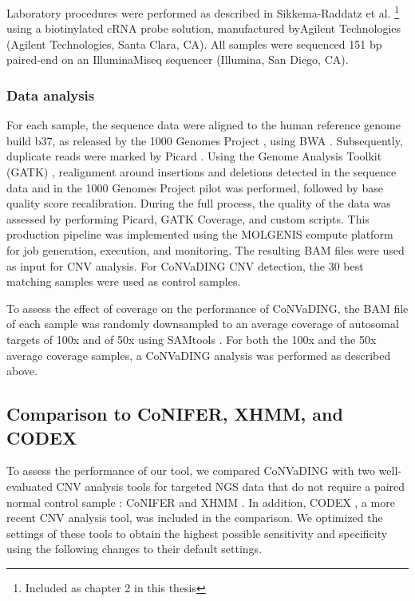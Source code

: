 Laboratory procedures were performed as described in Sikkema-Raddatz et al. \cite{Sikkema_Raddatz_2013}\footnote{Included as chapter 2 in this thesis} using a biotinylated cRNA probe solution, manufactured byAgilent Technologies (Agilent Technologies, Santa Clara, CA). 
All samples were sequenced 151 bp paired-end on an IlluminaMiseq sequencer (Illumina, San Diego, CA).

\subsubsection{Data analysis}
For each sample, the sequence data were aligned to the human reference genome build b37, as released by the 1000 Genomes Project \cite{Durbin_2010}, using BWA \cite{Li_2010}. 
Subsequently, duplicate reads were marked by Picard \cite{Picard_nd}. 
Using the Genome Analysis Toolkit (GATK) \cite{McKenna_2010}, realignment around insertions and deletions detected in the sequence data and in the 1000 Genomes Project pilot \cite{Durbin_2010} was performed, followed by base quality score recalibration. 
During the full process, the quality of the data was assessed by performing Picard, GATK Coverage, and custom scripts. This production pipeline was implemented using the MOLGENIS compute \cite{Byelas2013ScalingBF} platform for job generation, execution, and monitoring. 
The resulting BAM files were used as input for CNV analysis. 
For CoNVaDING CNV detection, the 30 best matching samples were used as control samples. 

To assess the effect of coverage on the performance of CoNVaDING, the BAM file of each sample was randomly downsampled to an average coverage of autosomal targets of 100x and of 50x using SAMtools \cite{Li_2009}. 
For both the 100x and the 50x average coverage samples, a CoNVaDING analysis was performed as described above.

\subsection{Comparison to CoNIFER, XHMM, and CODEX}
To assess the performance of our tool, we compared CoNVaDING with two well-evaluated CNV analysis tools for targeted NGS data that do not require a paired normal control sample \cite{Guo_2013,Magi_2013,Backenroth_2014,Tan_2014}: CoNIFER \cite{Krumm_2012} and XHMM \cite{Fromer_2012}. 
In addition, CODEX \cite{Jiang_2015}, a more recent CNV analysis tool, was included in the comparison. 
We optimized the settings of these tools to obtain the highest possible sensitivity and specificity using the following changes to their default settings. 

